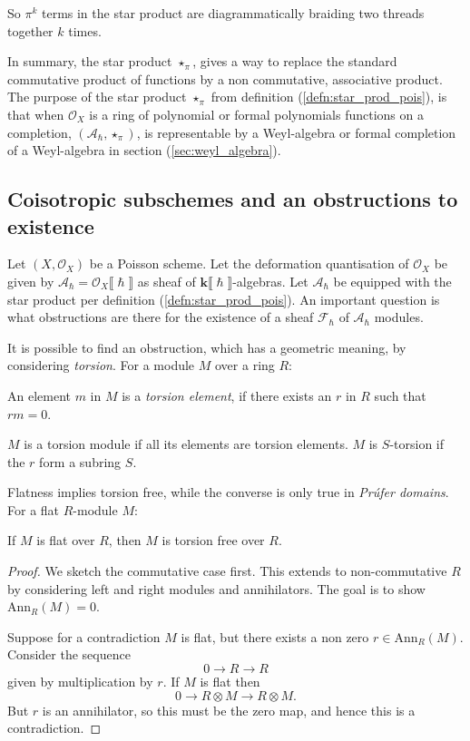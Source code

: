     So \( \pi^k\) terms in the star product are diagrammatically braiding two threads together \( k \) times.
    
    
    In summary, the star product \(\star_{\pi}\), gives a way to replace the standard commutative product of functions by a non commutative, associative product. %
    The purpose of the star product \( \star_{\pi}\) from definition (\ref{defn:star_prod_pois}), is that when \( \mathcal{O}_X\) is a ring of polynomial or formal polynomials functions on a completion, \((\mathcal{A}_{\hslash}, \star_{\pi})\), is representable by a Weyl-algebra or formal completion of a Weyl-algebra in section (\ref{sec:weyl_algebra}). 
    

    
    \subsection{Coisotropic subschemes and an obstructions to existence}
    
    Let \((X,\mathcal{O}_X)\) be a Poisson scheme. Let the deformation quantisation of \(\mathcal{O}_X\) be given by \(\mathcal{A}_{\hslash} = \mathcal{O}_X\lBrack \hslash \rBrack\) as sheaf of \( \mathbf{k} \lBrack \hslash \rBrack\)-algebras. Let \( \mathcal{A}_{\hslash}\) be equipped with the star product per definition (\ref{defn:star_prod_pois}).  An important question is what obstructions are there for the existence of a sheaf \(\mathcal{F}_\hslash\) of \( \mathcal{A}_{\hslash}\) modules. 
    
    It is possible to find an obstruction, which has a geometric meaning, by considering \emph{torsion}. For a module \(M\) over a ring \(R\):
    \begin{defn} An element \(m\) in \(M\) is a \emph{torsion element}, if there exists an \(r \) in \(R\) such that \(rm=0\).
    \end{defn}
    \(M\) is a torsion module if all its elements are torsion elements. \(M\) is \(S\)-torsion if the \(r\) form a subring \(S\). 
    
    Flatness implies torsion free, while the converse is only true in \emph{Pr\'ufer domains}. For a flat \(R\)-module \(M\):
    \begin{lem}
    If \(M\) is flat over \(R\), then \(M\) is torsion free over \(R\).
    \end{lem}
    
    \begin{proof}
    We sketch the commutative case first. This extends to non-commutative \(R\) by considering left and right modules and annihilators. The goal is to show \( \mathrm{Ann}_R(M) = 0\).

    Suppose for a contradiction \(M\) is flat, but there exists a non zero \(r\in \mathrm{Ann}_R(M)\). Consider the sequence \[ 0 \rightarrow R \rightarrow R \] 
    given by multiplication by \(r\). If \( M\) is flat then
    \[ 0 \rightarrow R \otimes M \rightarrow R \otimes M. \]
    But \(r\) is an annihilator, so this must be the zero map, and hence this is a contradiction.
    \end{proof}
    
